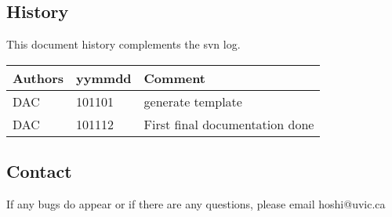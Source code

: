 \subsection{History} 
This document history complements the svn log.

\begin{tabular*}{\textwidth}{lll}
\hline
Authors & yymmdd & Comment \\
\hline
DAC & 101101 & generate template \\
DAC & 101112 & First final documentation done \\
\hline
\end{tabular*}


\subsection{Contact}
If any bugs do appear or if there are any questions, please email hoshi@uvic.ca
\begin{verbatim}

\end{verbatim}


%
%
%
%
